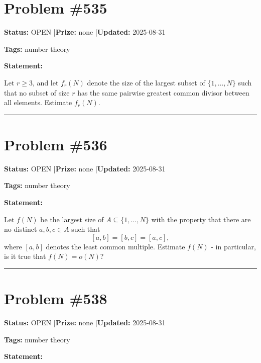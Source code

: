 \documentclass{article}
\begin{document}
\section{Problem \#535}
\label{prob:535}

\noindent\textbf{Status:} OPEN \quad|\quad \textbf{Prize:} none \quad|\quad \textbf{Updated:} 2025-08-31

\noindent\textbf{Tags:} number theory

\medskip

\noindent\textbf{Statement:}

Let $r\geq 3$, and let $f_r(N)$ denote the size of the largest subset of $\{1,\ldots,N\}$ such that no subset of size $r$ has the same pairwise greatest common divisor between all elements. Estimate $f_r(N)$.

\noindent\rule{\linewidth}{0.4pt}


\section{Problem \#536}
\label{prob:536}

\noindent\textbf{Status:} OPEN \quad|\quad \textbf{Prize:} none \quad|\quad \textbf{Updated:} 2025-08-31

\noindent\textbf{Tags:} number theory

\medskip

\noindent\textbf{Statement:}

Let $f(N)$ be the largest size of $A\subseteq \{1,\ldots,N\}$ with the property that there are no distinct $a,b,c\in A$ such that\[[a,b]=[b,c]=[a,c],\]where $[a,b]$ denotes the least common multiple. Estimate $f(N)$ - in particular, is it true that $f(N)=o(N)$?

\noindent\rule{\linewidth}{0.4pt}


\section{Problem \#538}
\label{prob:538}

\noindent\textbf{Status:} OPEN \quad|\quad \textbf{Prize:} none \quad|\quad \textbf{Updated:} 2025-08-31

\noindent\textbf{Tags:} number theory

\medskip

\noindent\textbf{Statement:}
\end{document}
